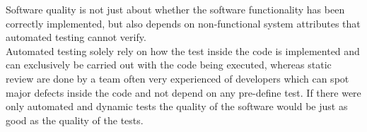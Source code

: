 \begin{parlist}
Software quality is not just about whether the software functionality has been correctly implemented, but also depends on non-functional system attributes that automated testing cannot verify.\\

Automated testing solely rely on how the test inside the code is implemented and can exclusively be carried out with the code being executed, whereas static review are done by a team often very experienced of developers which can spot major defects inside the code and not depend on any pre-define test. If there were only automated and dynamic tests the quality of the software would be just as good as the quality of the tests.
\end{parlist}